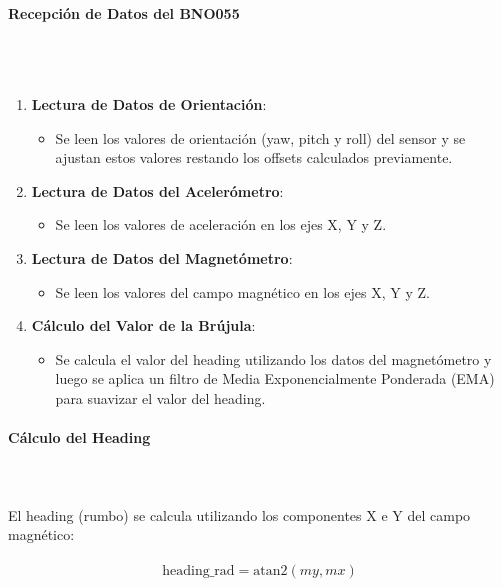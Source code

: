 \paragraph{\large Recepción de Datos del \textbf{BNO055}}
\\ \\
\begin{enumerate}
    \item \textbf{Lectura de Datos de Orientación}:
    \begin{itemize}
        \item Se leen los valores de orientación (yaw, pitch y roll) del sensor y se ajustan estos valores restando los offsets calculados previamente.
    \end{itemize}

    \item \textbf{Lectura de Datos del Acelerómetro}:
    \begin{itemize}
        \item Se leen los valores de aceleración en los ejes X, Y y Z.
    \end{itemize}

    \item \textbf{Lectura de Datos del Magnetómetro}:
    \begin{itemize}
        \item Se leen los valores del campo magnético en los ejes X, Y y Z.
    \end{itemize}

    \item \textbf{Cálculo del Valor de la Brújula}:
    \begin{itemize}
        \item Se calcula el valor del heading utilizando los datos del magnetómetro y luego se aplica un filtro de Media Exponencialmente Ponderada (EMA) para suavizar el valor del heading.
    \end{itemize}
\end{enumerate}



\paragraph{\large  \textbf{Cálculo del Heading}}
\\ \\
El heading (rumbo) se calcula utilizando los componentes X e Y del campo magnético:
\\ \\
\[
\text{heading\_rad} = \text{atan2}(my, mx)
\]

